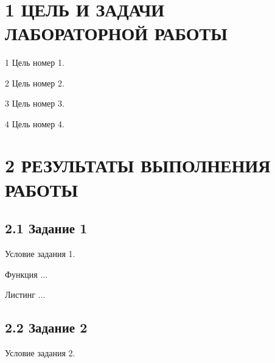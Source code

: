 \documentclass[a4paper,14pt]{extarticle} %
\begin{document}
\pagestyle{fancy}
\fancyhf{}                          %
\fancyfoot[R]{\thepage}             %
\renewcommand{\headrulewidth}{0pt}  %
\renewcommand{\footrulewidth}{0pt}  %


\thispagestyle{empty} 
\setcounter{page}{2}

\section*{1 ЦЕЛЬ И ЗАДАЧИ ЛАБОРАТОРНОЙ РАБОТЫ}
  1 Цель номер 1.

  2 Цель номер 2.

  3 Цель номер 3.

  4 Цель номер 4.

\section*{2 РЕЗУЛЬТАТЫ ВЫПОЛНЕНИЯ РАБОТЫ}
\subsection*{2.1 Задание 1}
  Условие задания 1.

  Функция ...


  Листинг ...


\subsection*{2.2 Задание 2}
  Условие задания 2.
\end{document}
